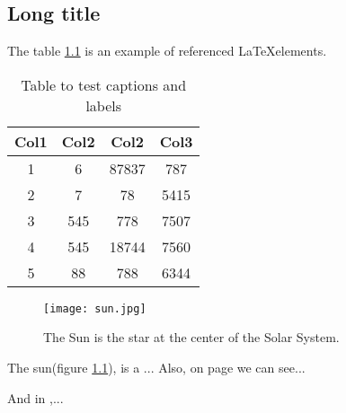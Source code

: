 \begin{refsection} %
\chapter[Short title]{Long title}

The table \ref{table:2} is an example of referenced \LaTeX elements.

\begin{table}[h!]
	\centering
	\begin{tabular}{||c c c c||} 
		\hline
		Col1 & Col2 & Col2 & Col3 \\ [0.5ex] 
		\hline\hline
		1 & 6 & 87837 & 787 \\ 
		2 & 7 & 78 & 5415 \\
		3 & 545 & 778 & 7507 \\
		4 & 545 & 18744 & 7560 \\
		5 & 88 & 788 & 6344 \\ [1ex] 
		\hline
	\end{tabular}
	\caption{Table to test captions and labels}
	\label{table:2}
\end{table}


\begin{figure}[ht]
	\centering
	\texttt{[image: sun.jpg]}
	\caption[The sun]{The Sun is the star at the center of the Solar System.}
	\centering
	\label{fig:3}
\end{figure}

The sun(figure \ref{fig:3}), is a ... Also, on page \pageref{fig:3}  we can see...

And in \cite{Piiponniemi2017},...

\printbibliography[heading=subbibliography, title={References}] %
\end{refsection}
